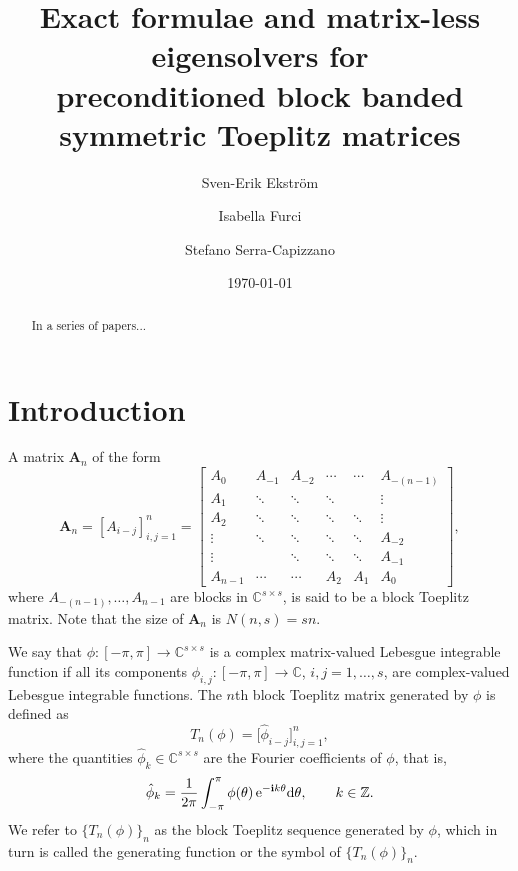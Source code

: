 \documentclass[10pt]{article}
\begin{document}
\title{Exact formulae and matrix-less eigensolvers for \\ preconditioned block banded symmetric Toeplitz matrices}
\author{Sven-Erik Ekstr\"om         \and
        Isabella Furci \and
        Stefano Serra-Capizzano 
}\date{\today}
\maketitle
\begin{abstract}
In a series of papers...
\end{abstract}
\section{Introduction}
\label{sec:intro}
A matrix $\textbf{A}_n$  of the form
\begin{equation*}
\textbf{A}_n=\left[A_{i-j}\right]_{i,j=1}^{n}=\begin{bmatrix}
A_0 & A_{-1} & A_{-2} & \cdots & \cdots & A_{-(n-1)} \\
A_1 & \ddots & \ddots & \ddots & & \vdots\\
A_2 & \ddots & \ddots & \ddots & \ddots & \vdots\\
\vdots & \ddots & \ddots & \ddots & \ddots & A_{-2}\\
\vdots & & \ddots & \ddots & \ddots & A_{-1}\\
A_{n-1} & \cdots & \cdots & A_2 & A_1 & A_0
\end{bmatrix},
\end{equation*}
where $A_{-(n-1)},\ldots,A_{n-1}$ are blocks in $\mathbb{C}^{s\times s}$, is said to be %
a block Toeplitz matrix. Note that the size of $\textbf{A}_n$ is $N(n,s)=sn$. 

We say that $\phi:[-\pi,\pi]\to\mathbb C^{s\times s}$ is a complex matrix-valued Lebesgue integrable function if all its components $\phi_{i,j}:[-\pi,\pi]\to \mathbb{C}$, $i,j=1,\dots, s$, are complex-valued Lebesgue integrable functions.
The $n$th block Toeplitz matrix generated by $\phi$ is defined as
\begin{equation*}
T_n(\phi)=\bigl[\hat \phi_{i-j}\bigr]_{i,j=1}^n,
\end{equation*}
where the quantities $\hat \phi_k \in \mathbb{C}^{s\times s}$ are the Fourier coefficients of $\phi$,  that is, 
\begin{equation}\label{fourier-coeff}
\hat \phi_{k}=\frac1{2\pi}\int_{-\pi}^{\pi}\phi(\theta)\,{\rm e}^{-\mathbf{i}k\theta}{\rm d}\theta,\qquad k\in\mathbb Z.
\end{equation}
We refer to $\{T_n(\phi)\}_n$ as the block Toeplitz sequence generated by $\phi$, which in turn is called the generating function or the symbol of $\{T_n(\phi)\}_n$.
\end{document}

